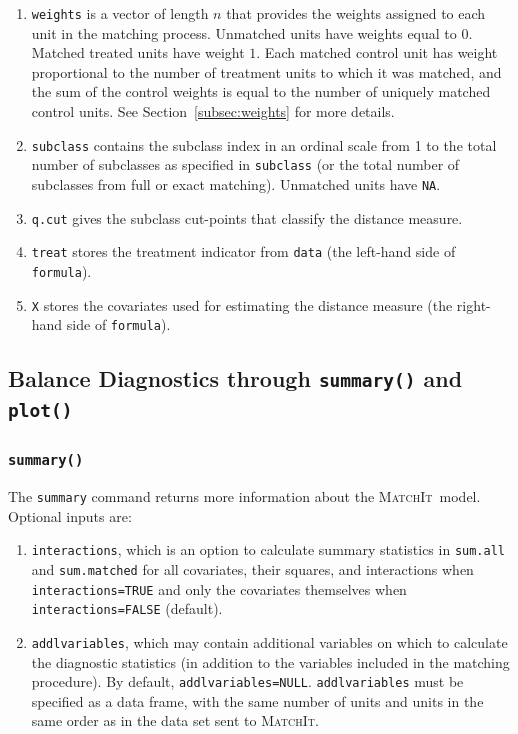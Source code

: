 \documentclass[oneside,letterpaper,titlepage]{article}
\newcommand{\MatchIt}{\textsc{MatchIt}}
\begin{document}
\begin{enumerate}
\item \texttt{weights} is a vector of length $n$ that provides the
  weights assigned to each unit in the matching process.  Unmatched
  units have weights equal to $0$. Matched treated units have weight
  $1$.  Each matched control unit has weight proportional to the
  number of treatment units to which it was matched, and the sum of
  the control weights is equal to the number of uniquely matched
  control units. See Section~\ref{subsec:weights} for more details.
  
\item \texttt{subclass} contains the subclass index in an ordinal
  scale from 1 to the total number of subclasses as specified in
  \texttt{subclass} (or the total number of subclasses from full or
  exact matching).  Unmatched units have \texttt{NA}.
  
\item \texttt{q.cut} gives the subclass cut-points that classify the
  distance measure.
  
\item \texttt{treat} stores the treatment indicator from
  \texttt{data} (the left-hand side of \texttt{formula}).
 
\item \texttt{X} stores the covariates used for estimating the
  distance measure (the right-hand side of \texttt{formula}).
\end{enumerate}


\subsection{Balance Diagnostics through {\tt summary()} and {\tt plot()}}
\label{cmd:sum}

\subsubsection{{\tt summary()}}
The \texttt{summary} command returns more information about the
\MatchIt\ model.  Optional inputs are:

\begin{enumerate}
\item \texttt{interactions}, which is an option to calculate summary
  statistics in \texttt{sum.all} and \texttt{sum.matched} for all
  covariates, their squares, and interactions when
  \texttt{interactions=TRUE} and only the covariates themselves when
  \texttt{interactions=FALSE} (default).
\item \texttt{addlvariables}, which may contain additional variables
  on which to calculate the diagnostic statistics (in addition to the
  variables included in the matching procedure).  By default,
  \texttt{addlvariables=NULL}.  \texttt{addlvariables} must be
  specified as a data frame, with the same number of units and units in
  the same order as in the data set sent to \MatchIt .
\end{enumerate}
\end{document}
